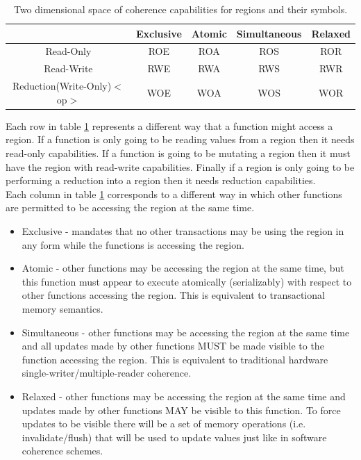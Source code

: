 \documentclass{article}
\theoremstyle{definition}
\begin{document}
\begin{table}
\centering
\begin{tabular}{|c||c|c|c|c|}
\hline
 & Exclusive & Atomic & Simultaneous & Relaxed \\ \hline \hline
Read-Only & ROE & ROA & ROS & ROR \\ \hline
Read-Write & RWE & RWA & RWS & RWR \\ \hline
Reduction(Write-Only)$<$op$>$ & WOE & WOA & WOS & WOR \\ \hline
\end{tabular}
\caption{Two dimensional space of coherence capabilities for regions and their symbols. \label{tab:capabilities}}
\end{table}

\noindent
Each row in table \ref{tab:capabilities} represents a different way that a function
might access a region.  If a function is only going to be reading values from a
region then it needs read-only capabilities.  If a function is going to be mutating
a region then it must have the region with read-write capabilities.  Finally if a
region is only going to be performing a reduction into a region then it needs
reduction capabilities. \\

\noindent
Each column in table \ref{tab:capabilities} corresponds to a different way in which
other functions are permitted to be accessing the region at the same time. 
\begin{itemize}
\item Exclusive - mandates that no other transactions may be using
the region in any form while the functions is accessing the region.
\item Atomic - other functions may be accessing the region at the same
time, but this function must appear to execute atomically (serializably) with respect
to other functions accessing the region.  This is equivalent to transactional memory semantics.
\item Simultaneous - other functions may be accessing the region at the
same time and all updates made by other functions MUST be made visible to the 
function accessing the region.  This is equivalent to traditional hardware
single-writer/multiple-reader coherence.
\item Relaxed - other functions may be accessing the region at the same time
and updates made by other functions MAY be visible to this function.  To force updates to be
visible there will be a set of memory operations (i.e. invalidate/flush) that
will be used to update values just like in software coherence schemes.
\end{itemize}
\end{document}
